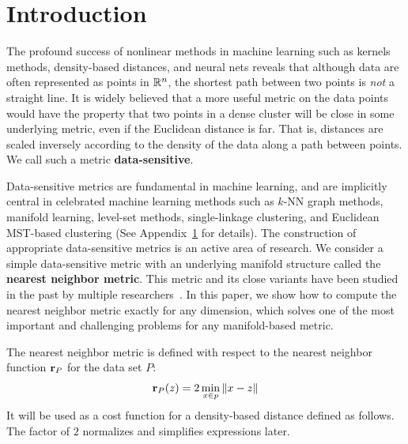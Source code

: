 \section{Introduction}

The profound success of nonlinear methods in machine learning such as kernels methods, density-based distances, and neural nets reveals that although data are often represented as points in $\mathbb{R}^n$, the shortest path between two points is \emph{not} a straight line.
It is widely believed that a more useful metric on the data points would have the property that two points in a dense cluster will be close in some underlying metric, even if the Euclidean distance is far.
That is, distances are scaled inversely according to the density of the data along a path between points.
We call such a metric \textbf{data-sensitive}.


Data-sensitive metrics are fundamental in machine learning, and are implicitly central in celebrated machine learning methods such as $k$-NN graph methods, manifold learning, level-set methods, single-linkage clustering, and Euclidean MST-based clustering (See Appendix~\ref{} for details).
The construction of appropriate data-sensitive metrics is an active area of research.
We consider a simple data-sensitive metric with an underlying manifold structure called the \textbf{nearest neighbor metric}.
This metric and its close variants have been studied in the past by multiple researchers~\cite{}.
In this paper, we show how to compute the nearest neighbor metric exactly for any dimension, which solves one of the most important and challenging problems for any manifold-based metric.

The nearest neighbor metric is defined with respect to the nearest neighbor function $\mathbf{r}_P$ for the data set $P$:
\[
\mathbf{r}_P(z) = 2\min_{x\in p} \|x-z\|
\]
It will be used as a cost function for a density-based distance defined as follows.
The factor of $2$ normalizes and simplifies expressions later.

